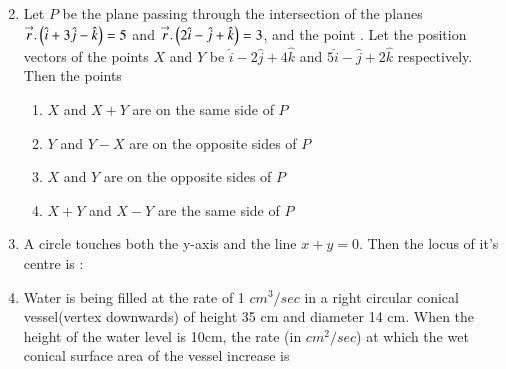 \documentclass[journal,,12pt,onecolumn]{IEEEtran}
\theoremstyle{remark}
\begin{document}
\begin{enumerate}
\begin{enumerate}
\begin{multicols}{2}
    \end{multicols}
        \end{enumerate}
\bigskip
\item Let $P$ be the plane passing through the intersection of the planes $\overset{\rightarrow}{r}.\left(\hat{i}+3\hat{j}-\hat{k}\right)=5$ and $\overset{\rightarrow}{r}.\left(2\hat{i}-\hat{j}+\hat{k}\right)=3$, and the point . Let the position vectors of the points $X$ and $Y$ be $\hat{i}-2\hat{j}+4\hat{k}$ and $5\hat{i}-\hat{j}+2\hat{k}$ respectively. Then the points 
\begin{enumerate}
    \item $X$ and $X+Y$ are on the same side of $P$
    \item $Y$ and $Y-X$ are on the opposite sides of $P$
    \item $X$ and $Y$ are on the opposite sides of $P$
    \item $X+Y$ and $X-Y$ are the same side of $P$
\end{enumerate}
\bigskip
\item A circle touches both the y-axis and the line $x+y=0$. Then the locus of it's centre is :
\begin{enumerate}
\end{enumerate}
\bigskip
\item Water is being filled at the rate of 1 ${cm}^3/sec$ in a right circular conical vessel(vertex downwards) of height 35 cm and diameter 14 cm. When the height of the water level is 10cm, the rate (in ${cm}^2/sec$) at which the wet conical surface area of the vessel increase is
\begin{enumerate}
\end{enumerate}
\end{enumerate}
\end{document}
